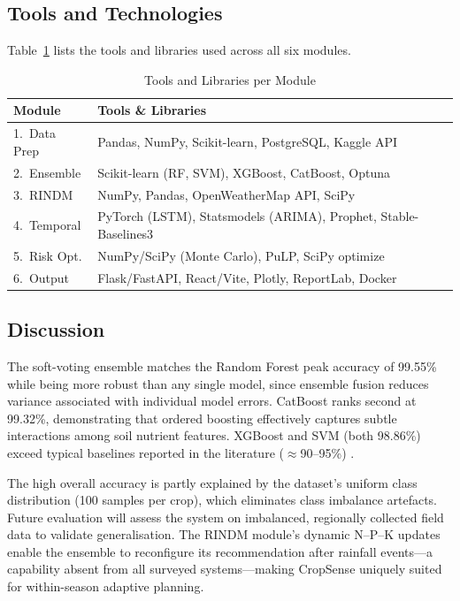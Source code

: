 \documentclass[conference]{IEEEtran}
\begin{document}
\subsection{Tools and Technologies}

Table~\ref{tab:tools} lists the tools and libraries used across all six
modules.

\begin{table}[htbp]
\caption{Tools and Libraries per Module}
\label{tab:tools}
\centering
\renewcommand{\arraystretch}{1.15}
\begin{tabular}{p{2.0cm}p{5.5cm}}
\toprule
\textbf{Module} & \textbf{Tools \& Libraries} \\
\midrule
1.\ Data Prep &
  Pandas, NumPy, Scikit-learn, PostgreSQL, Kaggle API \\
2.\ Ensemble &
  Scikit-learn (RF, SVM), XGBoost, CatBoost, Optuna \\
3.\ RINDM &
  NumPy, Pandas, OpenWeatherMap API, SciPy \\
4.\ Temporal &
  PyTorch (LSTM), Statsmodels (ARIMA), Prophet,
  Stable-Baselines3 \\
5.\ Risk Opt. &
  NumPy/SciPy (Monte Carlo), PuLP, SciPy optimize \\
6.\ Output &
  Flask/FastAPI, React/Vite, Plotly, ReportLab, Docker \\
\bottomrule
\end{tabular}
\end{table}

\subsection{Discussion}

The soft-voting ensemble matches the Random Forest peak accuracy of
99.55\% while being more robust than any single model, since ensemble
fusion reduces variance associated with individual model errors.
CatBoost ranks second at 99.32\%, demonstrating that ordered boosting
effectively captures subtle interactions among soil nutrient features.
XGBoost and SVM (both 98.86\%) exceed typical baselines reported in
the literature ($\approx$90--95\%) \cite{Patel2025,Pawan2024}.

The high overall accuracy is partly explained by the dataset's uniform
class distribution (100 samples per crop), which eliminates class
imbalance artefacts. Future evaluation will assess the system on
imbalanced, regionally collected field data to validate generalisation.
The RINDM module's dynamic N--P--K updates enable the ensemble to
reconfigure its recommendation after rainfall events---a capability
absent from all surveyed systems---making CropSense uniquely suited
for within-season adaptive planning.
\end{document}
